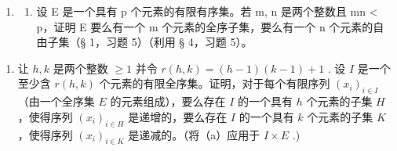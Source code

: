 \begin{enumerate}
\def\labelenumi{\arabic{enumi}.}
\setcounter{enumi}{17}
\tightlist
\item
  \begin{enumerate}
  \def\labelenumii{(\alph{enumii})}
  \tightlist
  \item
    设 E 是一个具有 p 个元素的有限有序集。若 m, n 是两个整数且 mn \textless{} p，证明 E 要么有一个 m 个元素的全序子集，要么有一个 n 个元素的自由子集（§ 1，习题 5）（利用 § 4，习题 5）。
  \end{enumerate}
\end{enumerate}

\begin{enumerate}
\def\labelenumi{(\alph{enumi})}
\setcounter{enumi}{1}
\tightlist
\item
  让 \(h, k\) 是两个整数 \(\geqslant 1\) 并令 \(r(h, k) = (h - 1)(k - 1) + 1\) . 设 \(I\) 是一个至少含 \(r(h, k)\) 个元素的有限全序集。证明，对于每个有限序列 \((x_i)_{i \in I}\) （由一个全序集 \(E\) 的元素组成），要么存在 \(I\) 的一个具有 \(h\) 个元素的子集 \(H\) ，使得序列 \((x_i)_{i \in H}\) 是递增的，要么存在 \(I\) 的一个具有 \(k\) 个元素的子集 \(K\) ，使得序列 \((x_i)_{i \in K}\) 是递减的。（将（a）应用于 \(I \times E\) .)
\end{enumerate}

